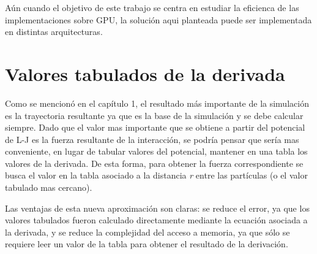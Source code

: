 Aún cuando el objetivo de este trabajo se centra en estudiar la eficienca de las implementaciones sobre GPU, la solución aqui planteada puede ser implementada en distintas arquitecturas.

\section{Valores tabulados de la derivada}

Como se mencionó en el capítulo 1, el resultado más importante de la simulación es la trayectoria resultante ya que es la base de la simulación y se debe calcular siempre.
Dado que el valor mas importante que se obtiene a partir del potencial de L-J es la fuerza resultante de la interacción, se podría pensar que sería mas conveniente, en lugar de tabular valores del potencial,
mantener en una tabla los valores de la derivada. De esta forma, para obtener la fuerza correspondiente se busca el valor en la tabla asociado a la distancia \textit{r} entre las partículas (o el valor tabulado mas cercano). 

Las ventajas de esta nueva aproximación son claras: se reduce el error, ya que los valores tabulados fueron calculado directamente mediante la ecuación asociada a la derivada, 
y se reduce la complejidad del acceso a memoria, ya que sólo se requiere leer un valor de la tabla para obtener el resultado de la derivación.

